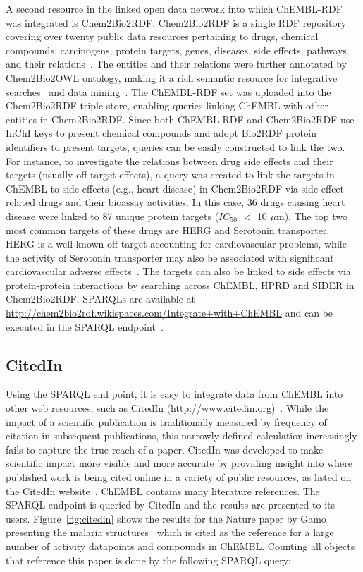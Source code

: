 \documentclass[10pt]{bmc_article}
\newenvironment{bmcformat}{\begin{raggedright}\baselineskip20pt\sloppy\setboolean{publ}{false}}{\end{raggedright}\baselineskip20pt\sloppy}
\begin{document}
\begin{bmcformat}
A second resource in the linked open data network into which ChEMBL-RDF was integrated is Chem2Bio2RDF.
Chem2Bio2RDF is a single RDF repository covering over twenty public data resources pertaining to drugs, chemical compounds, carcinogens,
protein targets, genes, diseases, side effects, pathways and their relations~\cite{Chen2010}. The entities and their relations were
further annotated by Chem2Bio2OWL ontology, making it a rich semantic resource for integrative searches~\cite{Chen2012a} and
data mining~\cite{Chen2012b}. The ChEMBL-RDF set was uploaded into the Chem2Bio2RDF triple store, enabling
queries linking ChEMBL with other entities in Chem2Bio2RDF. Since both ChEMBL-RDF and Chem2Bio2RDF use InChI keys to present chemical
compounds and adopt Bio2RDF protein identifiers to present targets, queries can be easily constructed to link the two. For instance,
to investigate the relations between drug side effects and their targets (usually off-target effects), a query was created to link the
targets in ChEMBL to side effects (e.g., heart disease) in Chem2Bio2RDF via side effect related drugs and their bioassay activities.
In this case, 36 drugs causing heart disease were linked to 87 unique protein targets ($IC_{50}$ $<$ 10 $\mu$m). The top two most common targets
of these drugs are HERG and Serotonin transporter. HERG is a well-known off-target accounting for cardiovascular problems, while
the activity of Serotonin transporter may also be associated with significant cardiovascular adverse effects~\cite{Levy2006}. 
The targets can also be linked to side effects via protein-protein interactions by searching across ChEMBL, HPRD and SIDER in
Chem2Bio2RDF. SPARQLs are available at \url{http://chem2bio2rdf.wikispaces.com/Integrate+with+ChEMBL} and can be executed in the
SPARQL endpoint~\cite{Chen2010}.



\subsection*{CitedIn}

Using the SPARQL end point, it is easy to integrate data from ChEMBL into other web resources, such as CitedIn (http://www.citedin.org)~\cite{CitedIn2011}.
While the impact of a scientific publication is traditionally measured by frequency of citation in subsequent publications, this
narrowly defined calculation increasingly fails to capture the true reach of a paper. CitedIn was developed to make scientific
impact more visible and more accurate by providing insight into where published work is being cited online in a variety of public
resources, as listed on the CitedIn website~\cite{CitedResources}.
ChEMBL contains many literature references. The SPARQL endpoint is queried by CitedIn and the results are presented to its users.
Figure~\ref{fig:citedin} shows the results for the Nature paper by Gamo presenting the malaria structures~\cite{Gamo2010}
which is cited as the reference for a large number of activity datapoints and compounds in ChEMBL.
Counting all objects that reference this paper is done by the following SPARQL query:


\end{bmcformat}
\end{document}
